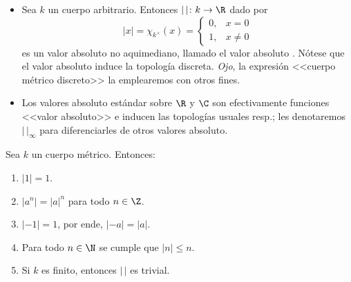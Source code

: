 \documentclass[teoria-numeros.tex]{subfiles}
\begin{document}
\begin{ex}
	\begin{itemize}
		\item Sea $k$ un cuerpo arbitrario. Entonces $|\,| \colon k \to \R $ dado por
			$$ |x| = \chi_{k^\times}(x) =
			\begin{cases}
				0, & x = 0 \\
				1, & x \ne 0
			\end{cases} $$
			es un valor absoluto no aquimediano, llamado el valor absoluto .
			Nótese que el valor absoluto induce la topología discreta.
			\textit{Ojo}, la expresión <<cuerpo métrico discreto>> la emplearemos con otros fines.

		\item Los valores absoluto estándar sobre $\R$ y $\C$ son efectivamente funciones <<valor absoluto>>
			e inducen las topologías usuales resp.; les denotaremos $| \, |_\infty$ para diferenciarles de otros valores absoluto.
	\end{itemize}
\end{ex}

\begin{cor}
	Sea $k$ un cuerpo métrico. Entonces:
	\begin{enumerate}
		\item $|1| = 1$.
		\item $|a^n| = |a|^n$ para todo $n \in \Z$.
		\item $|-1| = 1$, por ende, $|-a| = |a|$.
		\item Para todo $n \in \N$ se cumple que $|n| \le n$.
		\item Si $k$ es finito, entonces $|\,|$ es trivial.
	\end{enumerate}
\end{cor}
\end{document}
